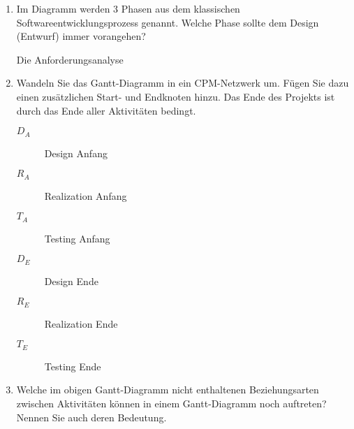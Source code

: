 \documentclass{lehramt-informatik-aufgabe}
\begin{document}
\begin{enumerate}


\item Im Diagramm werden 3 Phasen aus dem klassischen
Softwareentwicklungsprozess genannt. Welche Phase sollte dem Design
(Entwurf) immer vorangehen?

\begin{liAntwort}
Die Anforderungsanalyse
\end{liAntwort}


\item Wandeln Sie das Gantt-Diagramm in ein CPM-Netzwerk um. Fügen Sie
dazu einen zusätzlichen Start- und Endknoten hinzu. Das Ende des
Projekts ist durch das Ende aller Aktivitäten bedingt.

\begin{liAntwort}
\begin{description}
\item[$D_A$] Design Anfang
\item[$R_A$] Realization Anfang
\item[$T_A$] Testing Anfang
\item[$D_E$] Design Ende
\item[$R_E$] Realization Ende
\item[$T_E$] Testing Ende

\end{description}

\begin{center}
\end{center}
\end{liAntwort}

\item Welche im obigen Gantt-Diagramm nicht enthaltenen Beziehungsarten
zwischen Aktivitäten können in einem Gantt-Diagramm noch auftreten?
Nennen Sie auch deren Bedeutung.


\end{enumerate}
\end{document}
